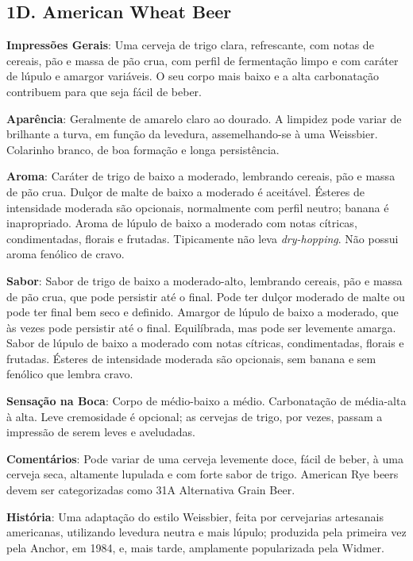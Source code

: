\subsection*{1D. American Wheat Beer}

\textbf{Impressões Gerais}: Uma cerveja de trigo clara, refrescante, com notas de cereais, pão e massa de pão crua, com perfil de fermentação limpo e com caráter de lúpulo e amargor variáveis. O seu corpo mais baixo e a alta carbonatação contribuem para que seja fácil de beber.

\textbf{Aparência}: Geralmente de amarelo claro ao dourado. A limpidez pode variar de brilhante a turva, em função da levedura, assemelhando-se à uma Weissbier. Colarinho branco, de boa formação e longa persistência.

\textbf{Aroma}: Caráter de trigo de baixo a moderado, lembrando cereais, pão e massa de pão crua. Dulçor de malte de baixo a moderado é aceitável. Ésteres de intensidade moderada são opcionais, normalmente com perfil neutro; banana é inapropriado. Aroma de lúpulo de baixo a moderado com notas cítricas, condimentadas, florais e frutadas. Tipicamente não leva \textit{dry-hopping}. Não possui aroma fenólico de cravo.

\textbf{Sabor}: Sabor de trigo de baixo a moderado-alto, lembrando cereais, pão e massa de pão crua, que pode persistir até o final. Pode ter dulçor moderado de malte ou pode ter final bem seco e definido. Amargor de lúpulo de baixo a moderado, que às vezes pode persistir até o final. Equilíbrada, mas pode ser levemente amarga. Sabor de lúpulo de baixo a moderado com notas cítricas, condimentadas, florais e frutadas. Ésteres de intensidade moderada são opcionais, sem banana e sem fenólico que lembra cravo.

\textbf{Sensação na Boca}: Corpo de médio-baixo a médio. Carbonatação de média-alta à alta. Leve cremosidade é opcional; as cervejas de trigo, por vezes, passam a impressão de serem leves e aveludadas.

\textbf{Comentários}: Pode variar de uma cerveja levemente doce, fácil de beber, à uma cerveja seca, altamente lupulada e com forte sabor de trigo. American Rye beers devem ser categorizadas como 31A Alternativa Grain Beer.

\textbf{História}: Uma adaptação do estilo Weissbier, feita por cervejarias artesanais americanas, utilizando levedura neutra e mais lúpulo; produzida pela primeira vez pela Anchor, em 1984, e, mais tarde, amplamente popularizada pela Widmer.

